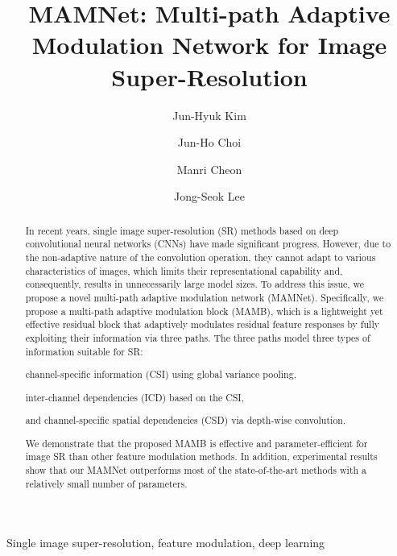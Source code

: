\documentclass[final,5p,times,twocolumn]{elsarticle}
\begin{document}
\begin{frontmatter}

\title{MAMNet: Multi-path Adaptive Modulation Network for Image Super-Resolution}

\author{Jun-Hyuk Kim}

\author{Jun-Ho Choi}

\author{Manri Cheon}

\author{Jong-Seok Lee}

\address{School of Integrated Technology, Yonsei University, 85 Songdogwahak-ro, Yeonsu-gu, Incheon, Korea}


\begin{abstract}
In recent years, single image super-resolution (SR) methods based on deep convolutional neural networks (CNNs) have made significant progress.
However, due to the non-adaptive nature of the convolution operation, they cannot adapt to various characteristics of images, which limits their representational capability and, consequently, results in unnecessarily large model sizes.
To address this issue, we propose a novel multi-path adaptive modulation network (MAMNet).
Specifically, we propose a multi-path adaptive modulation block (MAMB), which is a lightweight yet effective residual block that adaptively modulates residual feature responses by fully exploiting their information via three paths.
The three paths model three types of information suitable for SR:
\begin{inparaenum}[1)]
	\item channel-specific information (CSI) using global variance pooling, 
	\item inter-channel dependencies (ICD) based on the CSI,
	\item and channel-specific spatial dependencies (CSD) via depth-wise convolution.
\end{inparaenum}
We demonstrate that the proposed MAMB is effective and parameter-efficient for image SR than other feature modulation methods.
In addition, experimental results show that our MAMNet outperforms most of the state-of-the-art methods with a relatively small number of parameters.

\end{abstract}

\begin{keyword}
Single image super-resolution, feature modulation, deep learning
\end{keyword}

\end{frontmatter}
\end{document}
